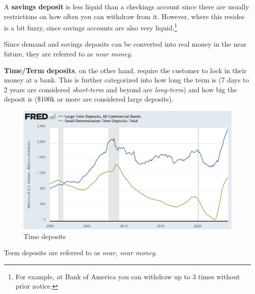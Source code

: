 \documentclass{article}
\begin{document}
    \begin{definition}
      A \textbf{savings deposit} is less liquid than a checkings account since there are usually restrictions on how often you can withdraw from it. However, where this resides is a bit fuzzy, since savings accounts are also very liquid.\footnote{For example, at Bank of America you can withdraw up to 3 times without prior notice. }

    \end{definition}

    Since demand and savings deposits can be converted into real money in the near future, they are referred to as \textit{near money}. 

    \begin{definition}
      \textbf{Time/Term deposits}, on the other hand, require the customer to lock in their money at a bank. This is further categorized into how long the term is (7 days to 2 years are considered \textit{short-term} and beyond are \textit{long-term}) and how big the deposit is (\$100k or more are considered large deposits). 
      \begin{figure}[H]
        \centering 
        \includegraphics[scale=0.4]{img/time_deposits.png}
        \caption{Time deposits} 
        \label{fig:time_deposit}
      \end{figure}
    \end{definition}

    Term deposits are referred to as \textit{near, near money}. 
\end{document}
